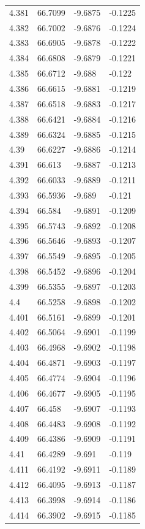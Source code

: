 \begin{tabular}{llll}
4.381 & 66.7099 & -9.6875 & -0.1225 \\
4.382 & 66.7002 & -9.6876 & -0.1224 \\
4.383 & 66.6905 & -9.6878 & -0.1222 \\
4.384 & 66.6808 & -9.6879 & -0.1221 \\
4.385 & 66.6712 & -9.688 & -0.122 \\
4.386 & 66.6615 & -9.6881 & -0.1219 \\
4.387 & 66.6518 & -9.6883 & -0.1217 \\
4.388 & 66.6421 & -9.6884 & -0.1216 \\
4.389 & 66.6324 & -9.6885 & -0.1215 \\
4.39 & 66.6227 & -9.6886 & -0.1214 \\
4.391 & 66.613 & -9.6887 & -0.1213 \\
4.392 & 66.6033 & -9.6889 & -0.1211 \\
4.393 & 66.5936 & -9.689 & -0.121 \\
4.394 & 66.584 & -9.6891 & -0.1209 \\
4.395 & 66.5743 & -9.6892 & -0.1208 \\
4.396 & 66.5646 & -9.6893 & -0.1207 \\
4.397 & 66.5549 & -9.6895 & -0.1205 \\
4.398 & 66.5452 & -9.6896 & -0.1204 \\
4.399 & 66.5355 & -9.6897 & -0.1203 \\
4.4 & 66.5258 & -9.6898 & -0.1202 \\
4.401 & 66.5161 & -9.6899 & -0.1201 \\
4.402 & 66.5064 & -9.6901 & -0.1199 \\
4.403 & 66.4968 & -9.6902 & -0.1198 \\
4.404 & 66.4871 & -9.6903 & -0.1197 \\
4.405 & 66.4774 & -9.6904 & -0.1196 \\
4.406 & 66.4677 & -9.6905 & -0.1195 \\
4.407 & 66.458 & -9.6907 & -0.1193 \\
4.408 & 66.4483 & -9.6908 & -0.1192 \\
4.409 & 66.4386 & -9.6909 & -0.1191 \\
4.41 & 66.4289 & -9.691 & -0.119 \\
4.411 & 66.4192 & -9.6911 & -0.1189 \\
4.412 & 66.4095 & -9.6913 & -0.1187 \\
4.413 & 66.3998 & -9.6914 & -0.1186 \\
4.414 & 66.3902 & -9.6915 & -0.1185 \\

\end{tabular}
